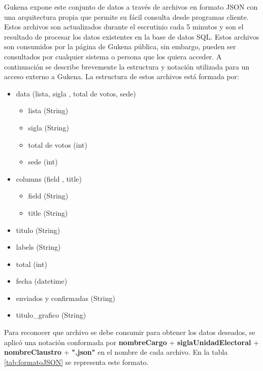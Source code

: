 Gukena expone este conjunto de datos a través de archivos en formato JSON con una arquitectura propia que permite su fácil consulta desde programas cliente. Estos archivos son actualizados durante el escrutinio cada 5 minutos y son el resultado de procesar los datos existentes en la base de datos SQL. Estos archivos son consumidos por la página de Gukena pública, sin embargo, pueden ser consultados por cualquier sistema o persona que los quiera acceder. A continuación se describe brevemente la estructura y notación utilizada para un acceso externo a Gukena.
La estructura de estos archivos está formada por:
\begin{itemize}
    \item data (lista, sigla , total de votos, sede)
    \begin{itemize}
        \item lista (String)
        \item sigla (String)
        \item total de votos (int)
        \item sede (int)
    \end{itemize}
    \item columns (field , title)
    \begin{itemize}
        \item field (String)
        \item title (String)
    \end{itemize}
    \item titulo (String)
    \item labels (String)
    \item total (int)
    \item fecha (datetime)
    \item enviados y confirmadas (String)
    \item titulo\_grafico (String)
\end{itemize}
Para reconocer que archivo se debe consumir para obtener los datos deseados,  se aplicó una notación conformada por \textbf{nombreCargo} + \textbf{siglaUnidadElectoral} + \textbf{nombreClaustro} + \textbf{".json"} en el nombre de cada archivo. En la tabla \ref{tab:formatoJSON} se representa este formato.

